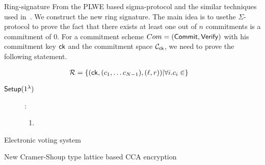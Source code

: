 \begin{subsection}{Ring-signature}
  From the PLWE based sigma-protocol and the similar techniques used in~\cite{DBLP:conf/eurocrypt/GrothK15}. We construct the new ring signature.
  The main idea is to usethe $\Sigma$-protocol to prove the fact that there exists at least one out of $n$ commitments is a commitment of $0$.
  For a commitment scheme $Com = ({\mathsf{Commit}}, {\mathsf{Verify}})$ with his commitment key $\mathsf{ck}$ and the commitment space $\mathcal{C}_{\mathsf{ck}}$,
  we need to prove the following statement.

  \begin{align*}
    \mathcal{R} &= \{(\mathsf{ck}, (c_1, \dots c_{N-1}), (\ell, r)) | \forall i. c_i \in \}
  \end{align*}
  \begin{description}
  \item[${\mathsf{Setup}}(1^{\lambda})$]:
    \begin{enumerate}
    \item 
    \end{enumerate}
  \end{description}
\end{subsection}

\begin{subsection}{Electronic voting system}
\end{subsection}

\begin{subsection}{New Cramer-Shoup type lattice based CCA encryption}

\end{subsection}
